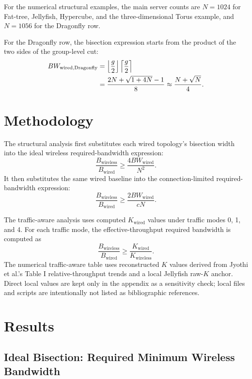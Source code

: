 \documentclass[conference]{IEEEtran}
\begin{document}
For the numerical structural examples, the main server counts are \(N=1024\) for Fat-tree, Jellyfish, Hypercube, and the three-dimensional Torus example, and \(N=1056\) for the Dragonfly row.

For the Dragonfly row, the bisection expression starts from the product of the two sides of the group-level cut:
\begin{align}
BW_{\mathrm{wired,Dragonfly}}
&=
\left\lfloor\frac{g}{2}\right\rfloor
\left\lceil\frac{g}{2}\right\rceil \notag\\
&=
\frac{2N+\sqrt{1+4N}-1}{8}
\approx
\frac{N+\sqrt{N}}{4}.
\end{align}

\section{Methodology}

The structural analysis first substitutes each wired topology's bisection width into the ideal wireless required-bandwidth expression:
\begin{equation}
\frac{B_{\mathrm{wireless}}}{B_{\mathrm{wired}}} \ge \frac{4BW_{\mathrm{wired}}}{N^2}.
\end{equation}
It then substitutes the same wired baseline into the connection-limited required-bandwidth expression:
\begin{equation}
\frac{B_{\mathrm{wireless}}}{B_{\mathrm{wired}}} \ge \frac{2BW_{\mathrm{wired}}}{cN}.
\end{equation}

The traffic-aware analysis uses computed \(K_{\mathrm{wired}}\) values under traffic modes 0, 1, and 4. For each traffic mode, the effective-throughput required bandwidth is computed as
\begin{equation}
\frac{B_{\mathrm{wireless}}}{B_{\mathrm{wired}}} \ge \frac{K_{\mathrm{wired}}}{K_{\mathrm{wireless}}}.
\end{equation}
The numerical traffic-aware table uses reconstructed \(K\) values derived from Jyothi et al.'s Table I relative-throughput trends and a local Jellyfish raw-\(K\) anchor. Direct local values are kept only in the appendix as a sensitivity check; local files and scripts are intentionally not listed as bibliographic references.

\section{Results}

\subsection{Ideal Bisection: Required Minimum Wireless Bandwidth}
\end{document}
